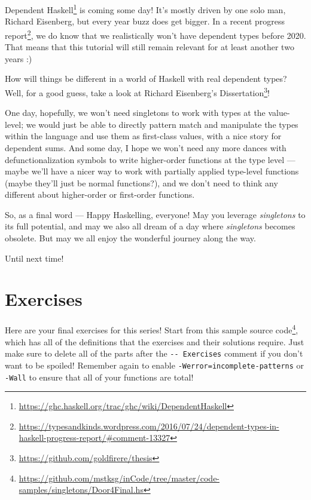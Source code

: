 \documentclass[]{article}
\renewcommand{\href}[2]{#2\footnote{\url{#1}}}
\begin{document}
\href{https://ghc.haskell.org/trac/ghc/wiki/DependentHaskell}{Dependent Haskell}
is coming some day! It's mostly driven by one solo man, Richard Eisenberg, but
every year buzz does get bigger. In a
\href{https://typesandkinds.wordpress.com/2016/07/24/dependent-types-in-haskell-progress-report/\#comment-13327}{recent
progress report}, we do know that we realistically won't have dependent types
before 2020. That means that this tutorial will still remain relevant for at
least another two years :)

How will things be different in a world of Haskell with real dependent types?
Well, for a good guess, take a look at
\href{https://github.com/goldfirere/thesis}{Richard Eisenberg's Dissertation}!

One day, hopefully, we won't need singletons to work with types at the
value-level; we would just be able to directly pattern match and manipulate the
types within the language and use them as first-class values, with a nice story
for dependent sums. And some day, I hope we won't need any more dances with
defunctionalization symbols to write higher-order functions at the type level
--- maybe we'll have a nicer way to work with partially applied type-level
functions (maybe they'll just be normal functions?), and we don't need to think
any different about higher-order or first-order functions.

So, as a final word --- Happy Haskelling, everyone! May you leverage
\emph{singletons} to its full potential, and may we also all dream of a day
where \emph{singletons} becomes obsolete. But may we all enjoy the wonderful
journey along the way.

Until next time!

\hypertarget{exercises}{%
\section{Exercises}\label{exercises}}

Here are your final exercises for this series! Start from
\href{https://github.com/mstksg/inCode/tree/master/code-samples/singletons/Door4Final.hs}{this
sample source code}, which has all of the definitions that the exercises and
their solutions require. Just make sure to delete all of the parts after the
\texttt{-\/-\ Exercises} comment if you don't want to be spoiled! Remember again
to enable \texttt{-Werror=incomplete-patterns} or \texttt{-Wall} to ensure that
all of your functions are total!
\end{document}
